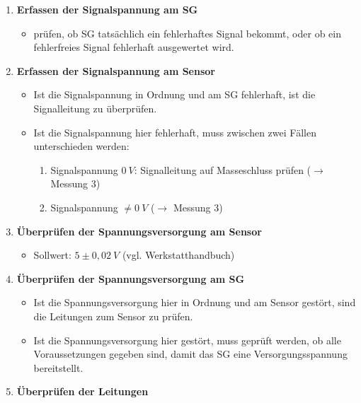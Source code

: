 \begin{enumerate}
\item
  \textbf{Erfassen der Signalspannung am SG}

  \begin{itemize}
  \item
    prüfen, ob SG tatsächlich ein fehlerhaftes Signal bekommt, oder ob
    ein fehlerfreies Signal fehlerhaft ausgewertet wird.
  \end{itemize}
\item
  \textbf{Erfassen der Signalspannung am Sensor}

  \begin{itemize}
  \item
    Ist die Signalspannung in Ordnung und am SG fehlerhaft, ist die
    Signalleitung zu überprüfen.
  \item
    Ist die Signalspannung hier fehlerhaft, muss zwischen zwei Fällen
    unterschieden werden:

    \begin{enumerate}
    \def\labelenumii{\arabic{enumii}.}
    \item
      Signalspannung $0~V$: Signalleitung auf Masseschluss prüfen
      ($\to$ Messung 3)
    \item
      Signalspannung $\neq 0~V$ ($\to$ Messung 3)
    \end{enumerate}
  \end{itemize}
\item
  \textbf{Überprüfen der Spannungsversorgung am Sensor}

  \begin{itemize}
  \item
    Sollwert: $5 \pm 0,02~V$ (vgl. Werkstatthandbuch)
  \end{itemize}
\item
  \textbf{Überprüfen der Spannungsversorgung am SG}

  \begin{itemize}
  \item
    Ist die Spannungsversorgung hier in Ordnung und am Sensor gestört,
    sind die Leitungen zum Sensor zu prüfen.
  \item
    Ist die Spannungsversorgung hier gestört, muss geprüft werden, ob
    alle Voraussetzungen gegeben sind, damit das SG eine
    Versorgungsspannung bereitstellt.
  \end{itemize}
\item
  \textbf{Überprüfen der Leitungen}


\end{enumerate}
